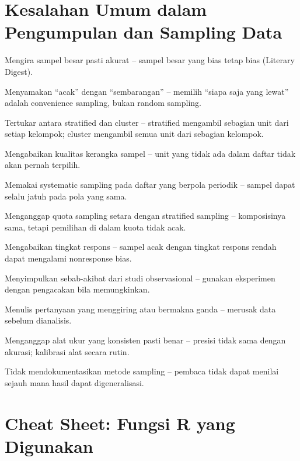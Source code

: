 \documentclass[
  indonesian,
  letterpaper,
]{book}
\begin{document}
\section{Kesalahan Umum dalam Pengumpulan dan Sampling
Data}\label{kesalahan-umum-dalam-pengumpulan-dan-sampling-data}

Mengira sampel besar pasti akurat -- sampel besar yang bias tetap bias
(Literary Digest).

Menyamakan ``acak'' dengan ``sembarangan'' -- memilih ``siapa saja yang
lewat'' adalah convenience sampling, bukan random sampling.

Tertukar antara stratified dan cluster -- stratified mengambil sebagian
unit dari setiap kelompok; cluster mengambil semua unit dari sebagian
kelompok.

Mengabaikan kualitas kerangka sampel -- unit yang tidak ada dalam daftar
tidak akan pernah terpilih.

Memakai systematic sampling pada daftar yang berpola periodik -- sampel
dapat selalu jatuh pada pola yang sama.

Menganggap quota sampling setara dengan stratified sampling --
komposisinya sama, tetapi pemilihan di dalam kuota tidak acak.

Mengabaikan tingkat respons -- sampel acak dengan tingkat respons rendah
dapat mengalami nonresponse bias.

Menyimpulkan sebab-akibat dari studi observasional -- gunakan eksperimen
dengan pengacakan bila memungkinkan.

Menulis pertanyaan yang menggiring atau bermakna ganda -- merusak data
sebelum dianalisis.

Menganggap alat ukur yang konsisten pasti benar -- presisi tidak sama
dengan akurasi; kalibrasi alat secara rutin.

Tidak mendokumentasikan metode sampling -- pembaca tidak dapat menilai
sejauh mana hasil dapat digeneralisasi.

\section{Cheat Sheet: Fungsi R yang
Digunakan}\label{cheat-sheet-fungsi-r-yang-digunakan-2}
\end{document}
